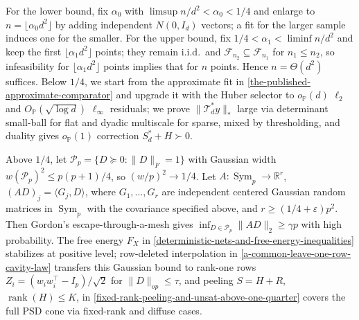 \documentclass[11pt]{article}
\numberwithin{equation}{section}
\theoremstyle{definition}
\theoremstyle{remark}
\newcommand{\R}{\mathbb R}
\newcommand{\Pp}{\mathbb P}
\newcommand{\1}{\boldsymbol 1}
\newcommand{\cF}{\mathcal F}
\newcommand{\cT}{\mathcal T}
\newcommand{\Sym}{\operatorname{Sym}}
\newcommand{\rank}{\operatorname{rank}}
\begin{document}
\begin{humanblock}
For the lower bound, fix $\alpha_0$ with
$\limsup n/d^2<\alpha_0<1/4$ and enlarge to
$n=\lfloor\alpha_0d^2\rfloor$ by adding
independent $N(0,I_d)$ vectors; a fit for the
larger sample induces one for the smaller. For
the upper bound, fix $1/4<\alpha_1<\liminf n/d^2$
and keep the first $\lfloor\alpha_1d^2\rfloor$
points; they remain i.i.d.\ and
$\cF_{n_2}\subseteq\cF_{n_1}$ for $n_1\le n_2$, so
infeasibility for $\lfloor\alpha_1d^2\rfloor$
points implies that for $n$ points. Hence
$n=\Theta(d^2)$ suffices. Below $1/4$, we start
from the approximate fit in
\cref{the-published-approximate-comparator} and
upgrade it with the Huber selector to
$o_{\Pp}(d)$ $\ell_2$ and $O_{\Pp}(\sqrt{\log d})$
$\ell_\infty$ residuals; we prove
$\|\cT_d^*y\|_*$ large via determinant small-ball
for flat and dyadic multiscale for sparse, mixed
by thresholding, and duality gives $o_{\Pp}(1)$
correction $S_d^*+H\succ0$.

Above $1/4$, let $\mathcal P_p=\{D\succeq0:\|D\|_F=1\}$ with
Gaussian width $w(\mathcal P_p)^2\le p(p+1)/4$,
so $(w/p)^2\to1/4$. Let $A:\Sym_p\to\R^r$, $(AD)_j=\langle G_j,D\rangle$, where
$G_1,\ldots,G_r$ are independent centered Gaussian random matrices in $\Sym_p$ with the covariance specified above, and $r\ge(1/4+\varepsilon)p^2$. Then Gordon's
escape-through-a-mesh \cite{Gordon1988} gives
$\inf_{D\in\mathcal P_p}\|AD\|_2\ge\gamma p$
with high probability. The free energy $F_X$ in
\cref{deterministic-nets-and-free-energy-inequalities}
stabilizes at positive level; row-deleted
interpolation in
\cref{a-common-leave-one-row-cavity-law} transfers
this Gaussian bound to rank-one rows
$Z_i=(w_iw_i^\top-I_p)/\sqrt2$ for
$\|D\|_{op}\le\tau$, and peeling
$S=H+R$, $\rank(H)\le K$, in
\cref{fixed-rank-peeling-and-unsat-above-one-quarter}
covers the full PSD cone via fixed-rank and
diffuse cases.
\end{humanblock}





\end{document}
